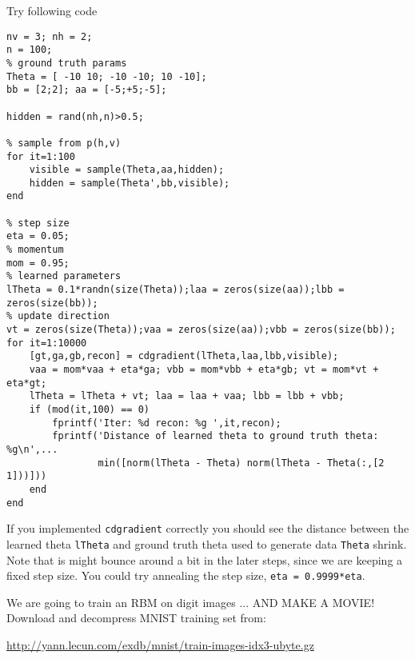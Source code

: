 \documentclass{article}
\begin{document}
Try following code
\begin{verbatim}
nv = 3; nh = 2;
n = 100;
% ground truth params
Theta = [ -10 10; -10 -10; 10 -10];
bb = [2;2]; aa = [-5;+5;-5];

hidden = rand(nh,n)>0.5;

% sample from p(h,v)
for it=1:100
    visible = sample(Theta,aa,hidden);
    hidden = sample(Theta',bb,visible);
end

% step size
eta = 0.05;
% momentum
mom = 0.95;
% learned parameters
lTheta = 0.1*randn(size(Theta));laa = zeros(size(aa));lbb = zeros(size(bb));
% update direction
vt = zeros(size(Theta));vaa = zeros(size(aa));vbb = zeros(size(bb));
for it=1:10000
    [gt,ga,gb,recon] = cdgradient(lTheta,laa,lbb,visible);
    vaa = mom*vaa + eta*ga; vbb = mom*vbb + eta*gb; vt = mom*vt + eta*gt;
    lTheta = lTheta + vt; laa = laa + vaa; lbb = lbb + vbb;
    if (mod(it,100) == 0)
        fprintf('Iter: %d recon: %g ',it,recon);
        fprintf('Distance of learned theta to ground truth theta: %g\n',...
                min([norm(lTheta - Theta) norm(lTheta - Theta(:,[2 1]))]))
    end
end
\end{verbatim}

If you implemented \verb|cdgradient| correctly you should see the distance between the
learned theta \verb|lTheta| and ground truth theta used to generate data \verb|Theta| shrink.
Note that is might bounce around a bit in the later steps, since we are keeping a fixed
step size. You could try annealing the step size, \eg \verb|eta = 0.9999*eta|.

\newproblem{2pt}
We are going to train an RBM on digit images ... AND MAKE A MOVIE!
Download and decompress  MNIST training set from:

\url{http://yann.lecun.com/exdb/mnist/train-images-idx3-ubyte.gz}
\end{document}
